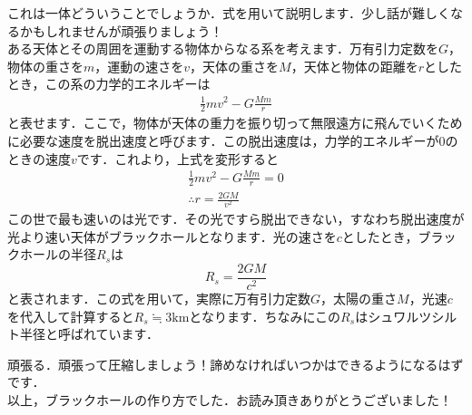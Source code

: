 \documentclass[dvipdfmx,a4paper,10pt]{jarticle}
\def\rm#1{\mathrm{#1}}
\begin{document}
\begin{tcolorbox}[enhanced,empty,left skip=0pt,left=5pt,
		coltitle=white,title={\bf どういうこと？},sharp corners,
		overlay={
				\begin{tcbclipframe}
					\fill[black] (title.south west)--++(3,0)--++(0,1)--++(-3,0)--cycle;
				\end{tcbclipframe}}]
	これは一体どういうことでしょうか．式を用いて説明します．少し話が難しくなるかもしれませんが頑張りましょう！\\
	ある天体とその周囲を運動する物体からなる系を考えます．万有引力定数を$G$，物体の重さを$m$，運動の速さを$v$，天体の重さを$M$，天体と物体の距離を$r$としたとき，この系の力学的エネルギーは
	\begin{gather*}
		\frac{1}{2}mv^2 - G\frac{Mm}{r}
	\end{gather*}
	と表せます．ここで，物体が天体の重力を振り切って無限遠方に飛んでいくために必要な速度を脱出速度と呼びます．この脱出速度は，力学的エネルギーが0のときの速度$v$です．これより，上式を変形すると
	\begin{gather*}
		\frac{1}{2}mv^2 - G\frac{Mm}{r} = 0\\
		\therefore r = \frac{2GM}{v^2}
	\end{gather*}
	この世で最も速いのは光です．その光ですら脱出できない，すなわち脱出速度が光より速い天体がブラックホールとなります．光の速さを$c$としたとき，ブラックホールの半径$R_s$は
	\begin{equation}
		R_s = \frac{2GM}{c^2}
		\nonumber
	\end{equation}
	と表されます．この式を用いて，実際に万有引力定数$G$，太陽の重さ$M$，光速$c$を代入して計算すると$R_s \fallingdotseq 3\rm{km}$となります．ちなみにこの$R_s$はシュワルツシルト半径と呼ばれています．
	
	\begin{tcolorbox}[enhanced,empty,left skip=0pt,left=5pt,
			coltitle=white,title={\bf どうやって圧縮するの？},sharp corners,
			overlay={
					\begin{tcbclipframe}
						\fill[black] (title.south west)--++(4.3,0)--++(0,1)--++(-4.3,0)--cycle;
					\end{tcbclipframe}}]
		頑張る．頑張って圧縮しましょう！諦めなければいつかはできるようになるはずです．\\
		以上，ブラックホールの作り方でした．お読み頂きありがとうございました！
	\end{tcolorbox}
	
\end{tcolorbox}
\end{document}
